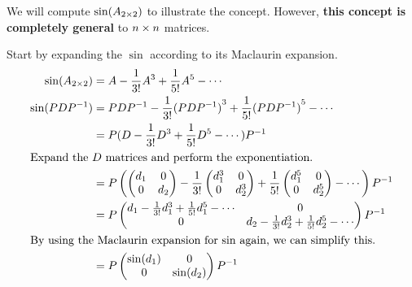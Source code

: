\begin{blackbox}
  We will compute $\sin(A_{2 \times 2})$ to illustrate the concept.
  However, \textbf{this concept is completely general} to $n \times n$ matrices.

  Start by expanding the $\sin$ according to its Maclaurin expansion.
  \begin{align*}
    \sin(A_{2 \times 2}) &= A - \frac{1}{3!} A^{3} + \frac{1}{5!} A^{5} - \cdots \\
    \sin(P D P^{-1}) &=  P D P^{-1} - \frac{1}{3!} {(P D P^{-1})}^{3} + \frac{1}{5!} {(P D P^{-1})}^{5} - \cdots \\
                      &= P (D - \frac{1}{3!} D^{3} + \frac{1}{5!} D^{5} - \cdots) P^{-1} \\
    \intertext{Expand the $D$ matrices and perform the exponentiation.}
    &= P \left(
      \begin{pmatrix}
        d_{1} & 0 \\
        0 & d_{2}
      \end{pmatrix} - \frac{1}{3!}
            \begin{pmatrix}
        d_{1}^{3} & 0 \\
        0 & d_{2}^{3}
      \end{pmatrix} + \frac{1}{5!}
            \begin{pmatrix}
        d_{1}^{5} & 0 \\
        0 & d_{2}^{5}
      \end{pmatrix} - \cdots \right) P^{-1} \\
    &= P
      \begin{pmatrix}
        d_{1} - \frac{1}{3!}d_{1}^{3} + \frac{1}{5!} d_{1}^{5} - \cdots & 0 \\
        0 & d_{2} - \frac{1}{3!}d_{2}^{3} + \frac{1}{5!} d_{2}^{5} - \cdots \\
      \end{pmatrix} P^{-1} \\
    \intertext{By using the Maclaurin expansion for $\sin$ again, we can simplify this.}
    &= P
      \begin{pmatrix}
        \sin(d_{1}) & 0 \\
        0 & \sin(d_{2}) \\
      \end{pmatrix} P^{-1}
  \end{align*}
\end{blackbox}


